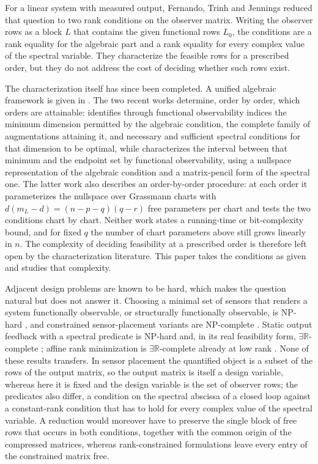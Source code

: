 \documentclass[journal]{IEEEtran}
\theoremstyle{plainn}
\begin{document}
For a linear system with measured output, Fernando, Trinh and Jennings \cite{fer10}
reduced that question to two rank conditions on the observer matrix. Writing the observer
rows as a block $L$ that contains the given functional rows $L_0$, the conditions are a
rank equality for the algebraic part and a rank equality for every complex value of the
spectral variable. They characterize the feasible rows for a prescribed order, but they do
not address the cost of deciding whether such rows exist.

The characterization itself has since been completed. A unified algebraic framework is
given in \cite{dar25}. The two recent works \cite{fer26a,fer26b} determine, order by order,
which orders are attainable: \cite{fer26a} identifies through functional observability
indices the minimum dimension permitted by the algebraic condition, the complete family of
augmentations attaining it, and necessary and sufficient spectral conditions for that
dimension to be optimal, while \cite{fer26b} characterizes the interval between that
minimum and the endpoint set by functional observability, using a nullspace representation
of the algebraic condition and a matrix-pencil form of the spectral one. The latter work
also describes an order-by-order procedure: at each order it parameterizes the nullspace
over Grassmann charts with $d(m_L-d)=(n-p-q)(q-r)$ free parameters per chart and tests the
two conditions chart by chart. Neither work states a running-time or bit-complexity bound,
and for fixed $q$ the number of chart parameters above still grows linearly in $n$. The
complexity of deciding feasibility at a prescribed order is therefore left open by the
characterization literature. This paper takes the conditions as given and studies that
complexity.

Adjacent design problems are known to be hard, which makes the question natural but does
not answer it. Choosing a minimal set of sensors that renders a system functionally
observable, or structurally functionally observable, is NP-hard \cite{zha25}, and
constrained sensor-placement variants are NP-complete \cite{dey21}. Static output feedback
with a spectral predicate is NP-hard \cite{lof26,bar26} and, in its real feasibility form,
$\exists\mathbb R$-complete \cite{liu26}; affine rank minimization is
$\exists\mathbb R$-complete already at low rank \cite{maj26}. None of these results
transfers. In sensor placement the quantified object is a subset of the rows of the output
matrix, so the output matrix is itself a design variable, whereas here it is fixed and the
design variable is the set of observer rows; the predicates also differ, a condition on the
spectral abscissa of a closed loop against a constant-rank condition that has to hold for
every complex value of the spectral variable. A reduction would moreover have to preserve
the single block of free rows that occurs in both conditions, together with the common
origin of the compressed matrices, whereas rank-constrained formulations leave every entry
of the constrained matrix free.
\end{document}
